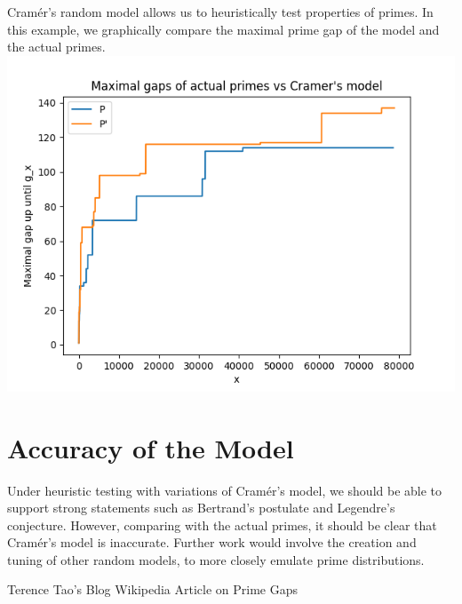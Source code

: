 \documentclass[conference]{IEEEtran}
\begin{document}
Cram\'er's random model allows us to heuristically test properties of primes.
In this example, we graphically compare the maximal prime gap of the model and the actual primes.
\includegraphics[scale=0.5]{graph.png}

\section{Accuracy of the Model}

Under heuristic testing with variations of Cram\'er's model, we should be able to support strong statements such as Bertrand's postulate and Legendre's conjecture. However, comparing with the actual primes, it should be clear that Cram\'er's model is inaccurate. Further work would involve the creation and tuning of other random models, to more closely emulate prime distributions.


\begin{thebibliography}{00}
 Terence Tao's Blog
 Wikipedia Article on Prime Gaps
\end{thebibliography}
\vspace{12pt}
\end{document}
